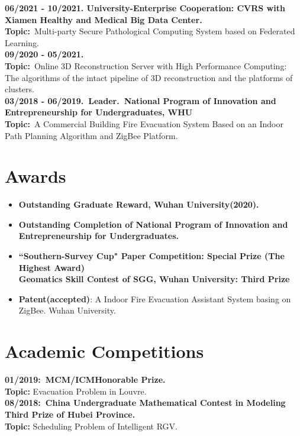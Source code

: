 \documentclass[a4paper]{article}
\begin{document}
\textbf{06/2021 - 10/2021. University-Enterprise Cooperation: CVRS with Xiamen Healthy and Medical Big Data Center.}\\
\textbf{Topic:}\ Multi-party Secure Pathological Computing System based on Federated Learning.\\
\textbf{09/2020 - 05/2021.}\\
\textbf{Topic:}\ Online 3D Reconstruction Server with High Performance Computing: The algorithms of the intact pipeline of 3D reconstruction and the platforms of clusters.\\
\textbf{03/2018 - 06/2019.\ Leader.\ National Program of Innovation and Entrepreneurship for Undergraduates, WHU}\\
\textbf{Topic:}\ A Commercial Building Fire Evacuation System Based on an Indoor Path Planning Algorithm and ZigBee Platform.
\section{Awards}
\vspace{-0.5em}
\begin{itemize}[itemsep = -0.5em,topsep = 0em]
    \item \textbf{Outstanding Graduate Reward, Wuhan University(2020).}
    \item \textbf{Outstanding Completion of National Program of Innovation and Entrepreneurship for Undergraduates.}
    \item \textbf{``Southern-Survey Cup" Paper Competition: Special Prize (The Highest Award)\\
              Geomatics Skill Contest of SGG, Wuhan University: Third Prize}
    \item \textbf{Patent(accepted)}: A Indoor Fire Evacuation Assistant System basing on ZigBee. Wuhan University.
\end{itemize}

\section{Academic Competitions}
\vspace{-0.5em}
\textbf{01/2019:\ MCM/ICM\hspace{2cm}Honorable Prize.}\\
\textbf{Topic:} Evacuation Problem in Louvre.\\
\textbf{08/2018:\ China Undergraduate Mathematical Contest in Modeling\\Third Prize of Hubei Province.}\\
\textbf{Topic:}  Scheduling Problem of Intelligent RGV.
\end{document}
